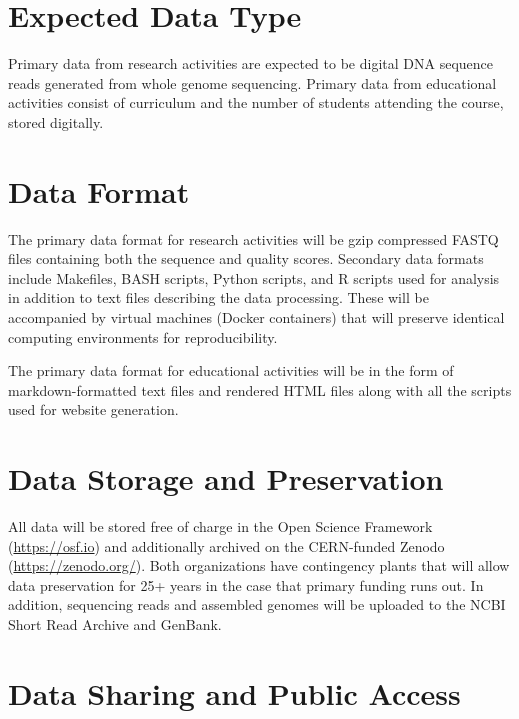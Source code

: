 \documentclass[12pt,letterpaper]{article}
\title{\ruleline{Data Management Plan}}
\begin{document}
\maketitle

\section{Expected Data Type}

Primary data from research activities are expected to be digital DNA sequence reads generated from whole genome sequencing. Primary data from educational activities consist of curriculum and the number of students attending the course, stored digitally. 

\section{Data Format}

The primary data format for research activities will be gzip compressed FASTQ files containing both the sequence and quality scores. Secondary data formats include Makefiles, BASH scripts, Python scripts, and R scripts used for analysis in addition to text files describing the data processing.
These will be accompanied by virtual machines (Docker containers) that will preserve identical computing environments for reproducibility. 

The primary data format for educational activities will be in the form of markdown-formatted text files and rendered HTML files along with all the scripts used for website generation. 

\section{Data Storage and Preservation}

All data will be stored free of charge in the Open Science Framework (\url{https://osf.io}) and additionally archived on the CERN-funded Zenodo (\url{https://zenodo.org/}). Both organizations have contingency plants that will allow data preservation for 25+ years in the case that primary funding runs out. In addition, sequencing reads and assembled genomes will be uploaded to the NCBI Short Read Archive and GenBank. 

\section{Data Sharing and Public Access}
\end{document}
